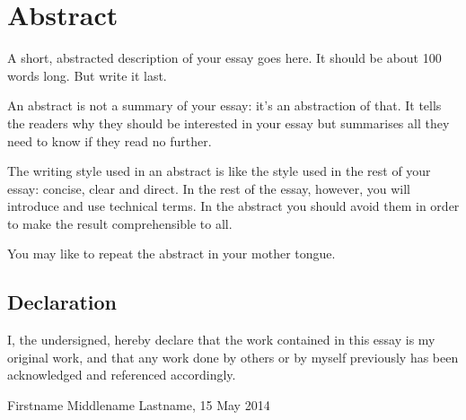 \chapter*{Abstract} 

A short, abstracted description of your essay goes here. 
It should be about 100 words long. But write it last.

An abstract is not a summary of your essay: it's an abstraction of that. 
It tells the readers why they should be interested in your essay but summarises all
they need to know if they read no further.

The writing style used in an abstract is like the style used in the rest of your essay: concise, clear and direct. 
In the rest of the essay, however, you will introduce and use technical terms. In the abstract you should
avoid them in order to make the result comprehensible to all.

You may like to repeat the abstract in your mother tongue.



\vfill
\section*{Declaration}
I, the undersigned, hereby declare that the work contained in this essay is my original work,
and that any work done by others or by myself previously has been 
acknowledged and referenced accordingly.

Firstname Middlename Lastname, 15 May 2014
